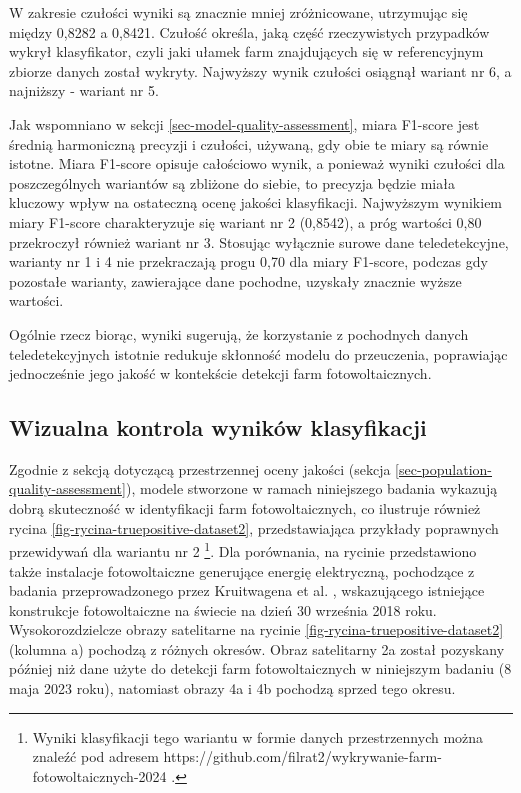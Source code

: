 \documentclass{amuthesis}
\begin{document}
W zakresie czułości wyniki są znacznie mniej zróżnicowane, utrzymując
się między 0,8282 a 0,8421. Czułość określa, jaką część rzeczywistych
przypadków wykrył klasyfikator, czyli jaki ułamek farm znajdujących się
w referencyjnym zbiorze danych został wykryty. Najwyższy wynik czułości
osiągnął wariant nr 6, a najniższy - wariant nr 5.

Jak wspomniano w sekcji \ref{sec-model-quality-assessment}, miara
F1-score jest średnią harmoniczną precyzji i czułości, używaną, gdy obie
te miary są równie istotne. Miara F1-score opisuje całościowo wynik, a
ponieważ wyniki czułości dla poszczególnych wariantów są zbliżone do
siebie, to precyzja będzie miała kluczowy wpływ na ostateczną ocenę
jakości klasyfikacji. Najwyższym wynikiem miary F1-score charakteryzuje
się wariant nr 2 (0,8542), a próg wartości 0,80 przekroczył również
wariant nr 3. Stosując wyłącznie surowe dane teledetekcyjne, warianty nr
1 i 4 nie przekraczają progu 0,70 dla miary F1-score, podczas gdy
pozostałe warianty, zawierające dane pochodne, uzyskały znacznie wyższe
wartości.

Ogólnie rzecz biorąc, wyniki sugerują, że korzystanie z pochodnych
danych teledetekcyjnych istotnie redukuje skłonność modelu do
przeuczenia, poprawiając jednocześnie jego jakość w kontekście detekcji
farm fotowoltaicznych.

\hypertarget{sec-visual-quality-assessment}{%
\subsection{Wizualna kontrola wyników
klasyfikacji}\label{sec-visual-quality-assessment}}

Zgodnie z sekcją dotyczącą przestrzennej oceny jakości (sekcja
\ref{sec-population-quality-assessment}), modele stworzone w ramach
niniejszego badania wykazują dobrą skuteczność w identyfikacji farm
fotowoltaicznych, co ilustruje również rycina
\ref{fig-rycina-truepositive-dataset2}, przedstawiająca przykłady
poprawnych przewidywań dla wariantu nr 2 \footnote{Wyniki klasyfikacji
  tego wariantu w formie danych przestrzennych można znaleźć pod adresem
  https://github.com/filrat2/wykrywanie-farm-fotowoltaicznych-2024 .}.
Dla porównania, na rycinie przedstawiono także instalacje fotowoltaiczne
generujące energię elektryczną, pochodzące z badania przeprowadzonego
przez Kruitwagena et al. \autocite*{kruitwagen_2021_pv}, wskazującego
istniejące konstrukcje fotowoltaiczne na świecie na dzień 30 września
2018 roku. Wysokorozdzielcze obrazy satelitarne na rycinie
\ref{fig-rycina-truepositive-dataset2} (kolumna a) pochodzą z różnych
okresów. Obraz satelitarny 2a został pozyskany później niż dane użyte do
detekcji farm fotowoltaicznych w niniejszym badaniu (8 maja 2023 roku),
natomiast obrazy 4a i 4b pochodzą sprzed tego okresu.
\end{document}
